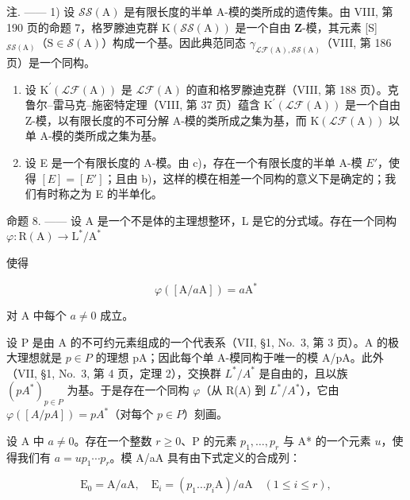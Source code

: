 注. —— 1) 设 \(\mathcal{S}\mathcal{S}(\mathrm{A})\) 是有限长度的半单 A-模的类所成的遗传集。由 VIII, 第 190 页的命题 7，格罗滕迪克群 \(\mathrm{K}(\mathcal{S}\mathcal{S}(\mathrm{A}))\) 是一个自由 \(\mathbf{Z}\)-模，其元素 {[}S{]} \(_{\mathcal{S}\mathcal{S}(\mathrm{A})}\)（\(\mathrm{S} \in \mathcal{S}(\mathrm{A})\)）构成一个基。因此典范同态 \(\gamma_{\mathcal{L}\mathcal{F}(\mathrm{A}),\mathcal{S}\mathcal{S}(\mathrm{A})}\)（VIII, 第 186 页）是一个同构。

\begin{enumerate}
\def\labelenumi{\arabic{enumi})}
\setcounter{enumi}{1}
\item
  设 \(\mathrm{K}^{\prime}(\mathcal{L}\mathcal{F}(\mathrm{A}))\) 是 \(\mathcal{L}\mathcal{F}(\mathrm{A})\) 的直和格罗滕迪克群（VIII, 第 188 页）。克鲁尔–雷马克–施密特定理（VIII, 第 37 页）蕴含 \(\mathrm{K}^{\prime}(\mathcal{L}\mathcal{F}(\mathrm{A}))\) 是一个自由 Z-模，以有限长度的不可分解 A-模的类所成之集为基，而 \(\mathrm{K}(\mathcal{L}\mathcal{F}(\mathrm{A}))\) 以单 A-模的类所成之集为基。
\item
  设 E 是一个有限长度的 A-模。由 c)，存在一个有限长度的半单 A-模 \(E'\)，使得 \([E] = [E']\)；且由 b)，这样的模在相差一个同构的意义下是确定的；我们有时称之为 E 的半单化。
\end{enumerate}

命题 8. —— 设 A 是一个不是体的主理想整环，L 是它的分式域。存在一个同构 \(\varphi : \mathrm{R}(\mathrm{A}) \to \mathrm{L}^{*}/\mathrm{A}^{*}\)

使得

\[
\varphi ([ \mathrm{A} / a \mathrm{A} ]) = a \mathrm{A} ^ {*}\tag{9}
\]

对 A 中每个 \(a \neq 0\) 成立。

设 P 是由 A 的不可约元素组成的一个代表系（VII, §1, No.~3, 第 3 页）。A 的极大理想就是 \(p \in P\) 的理想 pA；因此每个单 A-模同构于唯一的模 A/pA。此外（VII, §1, No.~3, 第 4 页，定理 2），交换群 \(L^{*}/A^{*}\) 是自由的，且以族 \((pA^{*})_{p \in P}\) 为基。于是存在一个同构 \(\varphi\)（从 R(A) 到 \(L^{*}/A^{*}\)），它由 \(\varphi([A/pA]) = pA^{*}\)（对每个 \(p \in P\)）刻画。

设 A 中 \(a \neq 0\)。存在一个整数 \(r \geqslant 0\)、P 的元素 \(p_1, \ldots, p_r\) 与 A* 的一个元素 \(u\)，使得我们有 \(a = up_1 \cdots p_r\)。模 A/aA 具有由下式定义的合成列：

\[
\mathrm{E} _ {0} = \mathrm{A} / a \mathrm{A}, \quad \mathrm{E} _ {i} = (p _ {1} \dots p _ {i} \mathrm{A}) / a \mathrm{A} \quad (1 \leqslant i \leqslant r),
\]

